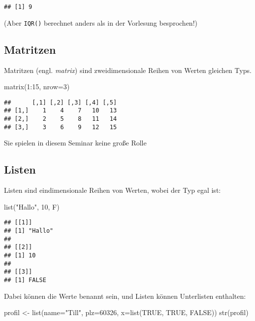 \documentclass[11pt,german,a4paper]{article}
\newenvironment{Shaded}{\begin{snugshade}}{\end{snugshade}}
\newcommand{\AttributeTok}[1]{\textcolor[rgb]{0.77,0.63,0.00}{#1}}
\newcommand{\ConstantTok}[1]{\textcolor[rgb]{0.00,0.00,0.00}{#1}}
\newcommand{\DecValTok}[1]{\textcolor[rgb]{0.00,0.00,0.81}{#1}}
\newcommand{\FunctionTok}[1]{\textcolor[rgb]{0.00,0.00,0.00}{#1}}
\newcommand{\NormalTok}[1]{#1}
\newcommand{\OtherTok}[1]{\textcolor[rgb]{0.56,0.35,0.01}{#1}}
\newcommand{\SpecialCharTok}[1]{\textcolor[rgb]{0.00,0.00,0.00}{#1}}
\newcommand{\StringTok}[1]{\textcolor[rgb]{0.31,0.60,0.02}{#1}}
\begin{document}
\begin{verbatim}
## [1] 9
\end{verbatim}

(Aber \texttt{IQR()} berechnet anders als in der Vorlesung besprochen!)

\hypertarget{matritzen}{%
\subsection{Matritzen}\label{matritzen}}

Matritzen (engl. \emph{matrix}) sind zweidimensionale Reihen von Werten gleichen Typs.

\begin{Shaded}
\begin{Highlighting}[]
\FunctionTok{matrix}\NormalTok{(}\DecValTok{1}\SpecialCharTok{:}\DecValTok{15}\NormalTok{, }\AttributeTok{nrow=}\DecValTok{3}\NormalTok{)}
\end{Highlighting}
\end{Shaded}

\begin{verbatim}
##      [,1] [,2] [,3] [,4] [,5]
## [1,]    1    4    7   10   13
## [2,]    2    5    8   11   14
## [3,]    3    6    9   12   15
\end{verbatim}

Sie spielen in diesem Seminar keine große Rolle

\hypertarget{listen}{%
\subsection{Listen}\label{listen}}

Listen sind eindimensionale Reihen von Werten, wobei der Typ egal ist:

\begin{Shaded}
\begin{Highlighting}[]
\FunctionTok{list}\NormalTok{(}\StringTok{"Hallo"}\NormalTok{, }\DecValTok{10}\NormalTok{, F)}
\end{Highlighting}
\end{Shaded}

\begin{verbatim}
## [[1]]
## [1] "Hallo"
## 
## [[2]]
## [1] 10
## 
## [[3]]
## [1] FALSE
\end{verbatim}

Dabei können die Werte benannt sein, und Listen können Unterlisten enthalten:

\begin{Shaded}
\begin{Highlighting}[]
\NormalTok{profil }\OtherTok{\textless{}{-}} \FunctionTok{list}\NormalTok{(}\AttributeTok{name=}\StringTok{"Till"}\NormalTok{, }\AttributeTok{plz=}\DecValTok{60326}\NormalTok{, }\AttributeTok{x=}\FunctionTok{list}\NormalTok{(}\ConstantTok{TRUE}\NormalTok{, }\ConstantTok{TRUE}\NormalTok{, }\ConstantTok{FALSE}\NormalTok{))}
\FunctionTok{str}\NormalTok{(profil)}
\end{Highlighting}
\end{Shaded}
\end{document}
